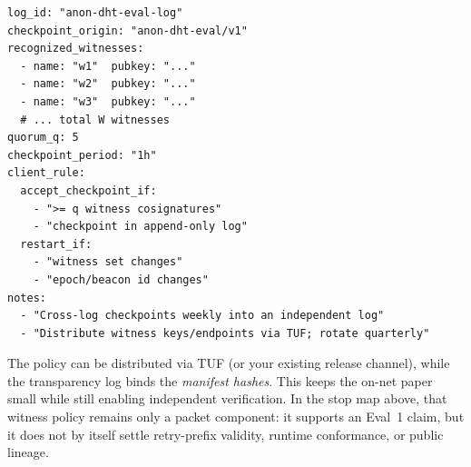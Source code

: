 \documentclass[11pt]{article}
\begin{document}
\begin{verbatim}
log_id: "anon-dht-eval-log"
checkpoint_origin: "anon-dht-eval/v1"
recognized_witnesses:
  - name: "w1"  pubkey: "..."
  - name: "w2"  pubkey: "..."
  - name: "w3"  pubkey: "..."
  # ... total W witnesses
quorum_q: 5
checkpoint_period: "1h"
client_rule:
  accept_checkpoint_if:
    - ">= q witness cosignatures"
    - "checkpoint in append-only log"
  restart_if:
    - "witness set changes"
    - "epoch/beacon id changes"
notes:
  - "Cross-log checkpoints weekly into an independent log"
  - "Distribute witness keys/endpoints via TUF; rotate quarterly"
\end{verbatim}

The policy can be distributed via TUF (or your existing release channel), while the transparency log binds the \emph{manifest hashes}.
This keeps the on-net paper small while still enabling independent verification.
In the stop map above, that witness policy remains only a packet component: it supports an Eval~1 claim, but it does not by itself settle retry-prefix validity, runtime conformance, or public lineage.
\end{document}
